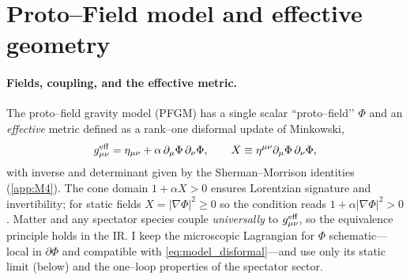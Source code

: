 \documentclass{iopjournal}
\begin{document}
\section{Proto–Field model and effective geometry}\label{sec:model}
\paragraph{Fields, coupling, and the effective metric.}
The proto–field gravity model (PFGM) has a single scalar ``proto–field’’ $\Phi$ and an \emph{effective} metric defined as a rank–one disformal update of Minkowski,
\begin{equation}
g^{\rm eff}_{\mu\nu}=\eta_{\mu\nu}+\alpha\,\partial_\mu\Phi\,\partial_\nu\Phi,
\qquad
X\equiv \eta^{\mu\nu}\partial_\mu\Phi\,\partial_\nu\Phi,
\label{eq:model_disformal}
\end{equation}
with inverse and determinant given by the Sherman–Morrison identities (\cref{app:M4}). The cone domain
$1+\alpha X>0$ ensures Lorentzian signature and invertibility; for static fields $X=|\nabla\Phi|^2\ge0$ so the condition reads $1+\alpha|\nabla\Phi|^2>0$ \cite{Bekenstein1993,BettoniLiberati2013}. Matter and any spectator species couple \emph{universally} to $g^{\rm eff}_{\mu\nu}$, so the equivalence principle holds in the IR. I keep the microscopic Lagrangian for $\Phi$ schematic—local in $\partial\Phi$ and compatible with \eqref{eq:model_disformal}—and use only its static limit (below) and the one–loop properties of the spectator sector.
\end{document}
